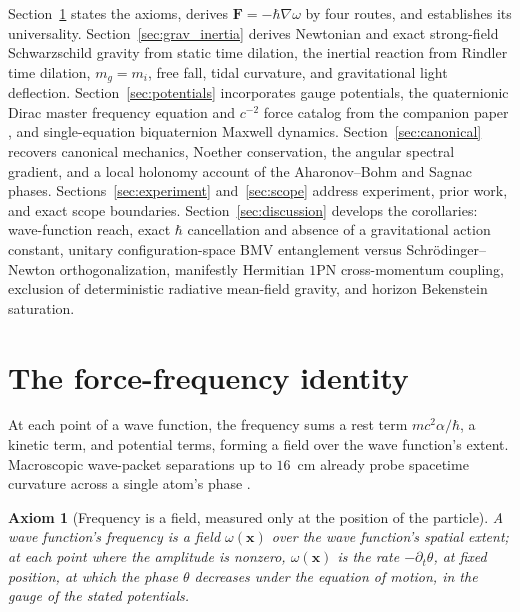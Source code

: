 \documentclass[aps,prd,onecolumn,tightenlines,nofootinbib,notitlepage,10pt,floatfix]{revtex4-2}
\theoremstyle{indentedtheorem}
\newtheorem{axiom}{Axiom}
\begin{document}
Section~\ref{sec:identity} states the axioms, derives $\mathbf{F}=-\hbar\nabla\omega$ by four routes, and establishes its universality. Section~\ref{sec:grav_inertia} derives Newtonian and exact strong-field Schwarzschild gravity from static time dilation, the inertial reaction from Rindler time dilation, $m_g=m_i$, free fall, tidal curvature, and gravitational light deflection. Section~\ref{sec:potentials} incorporates gauge potentials, the quaternionic Dirac master frequency equation and $c^{-2}$ force catalog from the companion paper \citep{HutchisonWavefn2026}, and single-equation biquaternion Maxwell dynamics. Section~\ref{sec:canonical} recovers canonical mechanics, Noether conservation, the angular spectral gradient, and a local holonomy account of the Aharonov--Bohm and Sagnac phases. Sections~\ref{sec:experiment} and~\ref{sec:scope} address experiment, prior work, and exact scope boundaries. Section~\ref{sec:discussion} develops the corollaries: wave-function reach, exact $\hbar$ cancellation and absence of a gravitational action constant, unitary configuration-space BMV entanglement versus Schr\"odinger--Newton orthogonalization, manifestly Hermitian $1$PN cross-momentum coupling, exclusion of deterministic radiative mean-field gravity, and horizon Bekenstein saturation.

\section{The force-frequency identity}
\label{sec:identity}

At each point of a wave function, the frequency sums a rest term $mc^2\alpha/\hbar$, a kinetic term, and potential terms, forming a field over the wave function's extent. Macroscopic wave-packet separations up to $16$~cm already probe spacetime curvature across a single atom's phase \citep{Asenbaum2017Phase}.

\begin{axiom}[Frequency is a field, measured only at the position of the particle]\label{ax:local_frequency}
A wave function's frequency is a field $\omega(\mathbf{x})$ over the wave function's spatial extent; at each point where the amplitude is nonzero, $\omega(\mathbf{x})$ is the rate $-\partial_t\theta$, at fixed position, at which the phase $\theta$ decreases under the equation of motion, in the gauge of the stated potentials.
\end{axiom}
\end{document}

